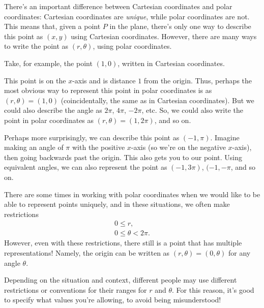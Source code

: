 \documentclass{ximera}
\begin{document}
There's an important difference between Cartesian coordinates and polar coordinates: Cartesian coordinates are \emph{unique}, while polar coordinates are not. This means that, given a point $P$ in the plane, there's only one way to describe this point as $(x,y)$ using Cartesian coordinates. However, there are many ways to write the point as $(r,\theta)$, using polar coordinates.

Take, for example, the point $(1,0)$, written in Cartesian coordinates.

\begin{image}
\end{image}

This point is on the $x$-axis and is distance $1$ from the origin. Thus, perhaps the most obvious way to represent this point in polar coordinates is as $(r,\theta) = (1,0)$ (coincidentally, the same as in Cartesian coordinates). But we could also describe the angle as $2\pi$, $4\pi$, $-2\pi$, etc. So, we could also write the point in polar coordinates as $(r,\theta) = (1,2\pi)$, and so on.

Perhaps more surprisingly, we can describe this point as $(-1,\pi)$. Imagine making an angle of $\pi$ with the positive $x$-axis (so we're on the negative $x$-axis), then going backwards past the origin. This also gets you to our point. Using equivalent angles, we can also represent the point as $(-1,3\pi)$, $(-1, -\pi$, and so on.

There are some times in working with polar coordinates when we would like to be able to represent points uniquely, and in these situations, we often make restrictions
\[
\begin{array}{c}
0\leq r,\\
0\leq \theta < 2\pi.
\end{array}
\]
However, even with these restrictions, there still is a point that has multiple representations! Namely, the origin can be written as $(r,\theta) = (0,\theta)$ for any angle $\theta$.

Depending on the situation and context, different people may use different restrictions or conventions for their ranges for $r$ and $\theta$. For this reason, it's good to specify what values you're allowing, to avoid being misunderstood!
\end{document}
